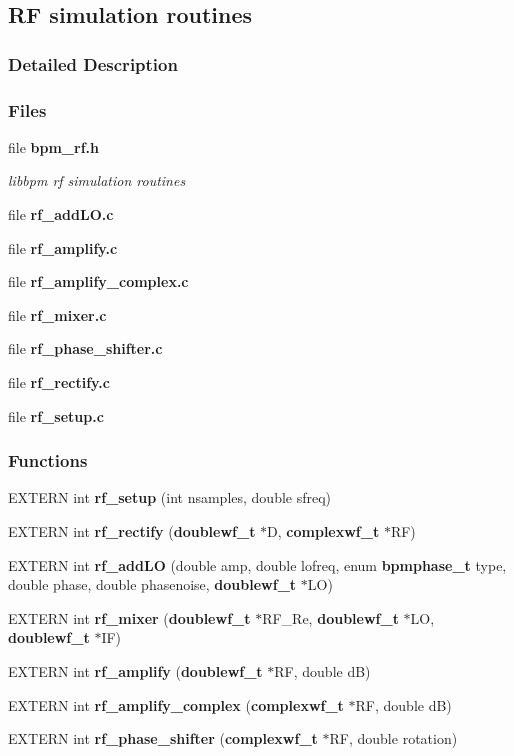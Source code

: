 \subsection{RF simulation routines}
\label{group__rf}


\subsubsection{Detailed Description}


\subsubsection*{Files}
\begin{CompactItemize}
\item 
file {\bf bpm\_\-rf.h}
\begin{CompactList}\small\item\em libbpm rf simulation routines \item\end{CompactList}

\item 
file {\bf rf\_\-addLO.c}
\item 
file {\bf rf\_\-amplify.c}
\item 
file {\bf rf\_\-amplify\_\-complex.c}
\item 
file {\bf rf\_\-mixer.c}
\item 
file {\bf rf\_\-phase\_\-shifter.c}
\item 
file {\bf rf\_\-rectify.c}
\item 
file {\bf rf\_\-setup.c}
\end{CompactItemize}
\subsubsection*{Functions}
\begin{CompactItemize}
\item 
EXTERN int {\bf rf\_\-setup} (int nsamples, double sfreq)
\item 
EXTERN int {\bf rf\_\-rectify} ({\bf doublewf\_\-t} $\ast$D, {\bf complexwf\_\-t} $\ast$RF)
\item 
EXTERN int {\bf rf\_\-addLO} (double amp, double lofreq, enum {\bf bpmphase\_\-t} type, double phase, double phasenoise, {\bf doublewf\_\-t} $\ast$LO)
\item 
EXTERN int {\bf rf\_\-mixer} ({\bf doublewf\_\-t} $\ast$RF\_\-Re, {\bf doublewf\_\-t} $\ast$LO, {\bf doublewf\_\-t} $\ast$IF)
\item 
EXTERN int {\bf rf\_\-amplify} ({\bf doublewf\_\-t} $\ast$RF, double dB)
\item 
EXTERN int {\bf rf\_\-amplify\_\-complex} ({\bf complexwf\_\-t} $\ast$RF, double dB)
\item 
EXTERN int {\bf rf\_\-phase\_\-shifter} ({\bf complexwf\_\-t} $\ast$RF, double rotation)
\end{CompactItemize}
